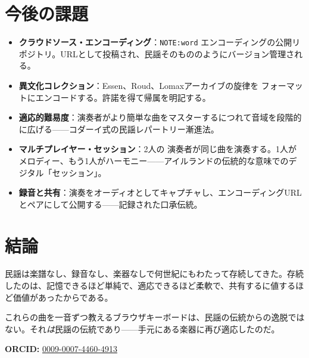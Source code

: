 \documentclass[11pt]{article}
\begin{document}
\section{今後の課題}

\begin{card}
\begin{itemize}
  \item \textbf{クラウドソース・エンコーディング}：\texttt{NOTE:word} エンコーディングの公開リポジトリ。URLとして投稿され、民謡そのもののようにバージョン管理される。
  \item \textbf{異文化コレクション}：Essen、Roud、Lomaxアーカイブの旋律を \np{} フォーマットにエンコードする。許諾を得て帰属を明記する。
  \item \textbf{適応的難易度}：演奏者がより簡単な曲をマスターするにつれて音域を段階的に広げる——コダーイ式の民謡レパートリー漸進法。
  \item \textbf{マルチプレイヤー・セッション}：2人の \np{} 演奏者が同じ曲を演奏する。1人がメロディー、もう1人がハーモニー——アイルランドの伝統的な意味でのデジタル「セッション」。
  \item \textbf{録音と共有}：演奏をオーディオとしてキャプチャし、エンコーディングURLとペアにして公開する——記録された口承伝統。
\end{itemize}
\end{card}

\section{結論}

民謡は楽譜なし、録音なし、楽器なしで何世紀にもわたって存続してきた。存続したのは、記憶できるほど単純で、適応できるほど柔軟で、共有するに値するほど価値があったからである。

これらの曲を一音ずつ教えるブラウザキーボードは、民謡の伝統からの逸脱ではない。それ\emph{は}民謡の伝統であり——手元にある楽器に再び適応したのだ。

\vspace{0.5em}
\noindent\textbf{ORCID:} \href{https://orcid.org/0009-0007-4460-4913}{0009-0007-4460-4913}



\end{document}
